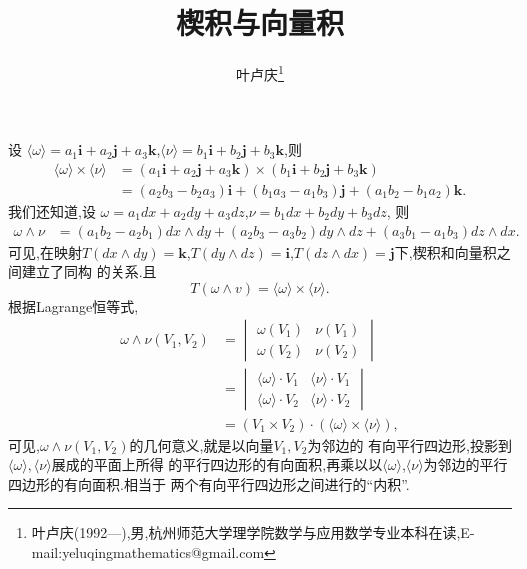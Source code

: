 \documentclass[a4paper]{article}
\begin{document}
\title{\huge{\bf{楔积与向量积}}} \author{\small{叶卢庆\footnote{叶卢庆(1992---),男,杭州师范大学理学院数学与应用数学专业本科在读,E-mail:yeluqingmathematics@gmail.com}}}
\maketitle
设
$\langle
\omega\rangle=a_1\mathbf{i}+a_2\mathbf{j}+a_3\mathbf{k}$,$\langle \nu\rangle=b_1\mathbf{i}+b_2\mathbf{j}+b_3\mathbf{k}$,则
\begin{align*}
  \langle\omega\rangle\times
  \langle\nu\rangle&=(a_1\mathbf{i}+a_2\mathbf{j}+a_3\mathbf{k})\times (b_1\mathbf{i}+b_2\mathbf{j}+b_3\mathbf{k})
\\&=(a_2b_3-b_2a_3)\mathbf{i}+(b_1a_3-a_1b_3)\mathbf{j}+(a_1b_2-b_1a_2)\mathbf{k}.
\end{align*}
我们还知道,设
$\omega=a_1dx+a_2dy+a_3dz$,$\nu=b_1dx+b_2dy+b_3dz$,
则
\begin{align*}
  \omega\wedge \nu&=(a_1b_2-a_2b_1)dx\wedge dy+(a_2b_3-a_3b_2)dy\wedge
  dz+(a_3b_1-a_1b_3)dz\wedge dx.
\end{align*}
可见,在映射$T(dx\wedge dy)=\mathbf{k}$,$T(dy\wedge
dz)=\mathbf{i}$,$T(dz\wedge dx)=\mathbf{j}$下,楔积和向量积之间建立了同构
的关系.且
\begin{equation}
  T(\omega\wedge v)=\langle\omega\rangle\times\langle \nu\rangle.
\end{equation}
根据Lagrange恒等式,
\begin{align*}
\omega\wedge \nu(V_1,V_2)&=
\begin{vmatrix}
  \omega(V_1)&\nu(V_1)\\
\omega(V_2)&\nu(V_2)
\end{vmatrix}\\&=
\begin{vmatrix}
  \langle \omega\rangle\cdot V_1&\langle \nu\rangle \cdot V_1\\
\langle \omega\rangle\cdot V_2&\langle \nu\rangle\cdot V_2
\end{vmatrix}\\&=(V_1\times V_2)\cdot \left(\langle \omega\rangle\times
\langle \nu\rangle\right),
\end{align*}
可见,$\omega\wedge \nu(V_1,V_2)$的几何意义,就是以向量$V_1,V_2$为邻边的
有向平行四边形,投影到$\langle\omega\rangle,\langle\nu\rangle$展成的平面上所得
的平行四边形的有向面积,再乘以以$\langle
\omega\rangle$,$\langle\nu\rangle$为邻边的平行四边形的有向面积.相当于
两个有向平行四边形之间进行的“内积”.
\end{document}
